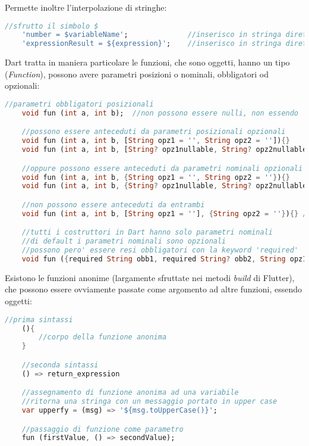 Permette inoltre l'interpolazione di stringhe:
\begin{lstlisting}[language=dart, firstnumber=1,caption={Dart \textit{null safety}}]
    //sfrutto il simbolo $
    'number = $variableName';              //inserisco in stringa direttamente una variabile
    'expressionResult = ${expression}';    //inserisco in stringa direttamente un'espressione
\end{lstlisting}

Dart tratta in maniera particolare le funzioni, che sono oggetti, hanno un tipo (\textit{Function}), possono avere parametri posizioni o nominali, obbligatori od opzionali: 
\begin{lstlisting}[language=dart, firstnumber=1,caption={Dart \textit{null safety}}]
    //parametri obbligatori posizionali
    void fun (int a, int b);  //non possono essere nulli, non essendo 'int? a'

    //possono essere anteceduti da parametri posizionali opzionali
    void fun (int a, int b, [String opz1 = '', String opz2 = '']){}
    void fun (int a, int b, [String? opz1nullable, String? opz2nullable]){}

    //oppure possono essere anteceduti da parametri nominali opzionali
    void fun (int a, int b, {String opz1 = '', String opz2 = ''}){}
    void fun (int a, int b, {String? opz1nullable, String? opz2nullable}){}

    //non possono essere anteceduti da entrambi
    void fun (int a, int b, [String opz1 = ''], {String opz2 = ''}){} //compile error

    //tutti i costruttori in Dart hanno solo parametri nominali
    //di default i parametri nominali sono opzionali
    //possono pero' essere resi obbligatori con la keyword 'required'
    void fun ({required String obb1, required String? obb2, String opz1 = ''}){}
\end{lstlisting}

Esistono le funzioni anonime (largamente sfruttate nei metodi \textit{build} di Flutter), che possono essere ovviamente passate come argomento ad altre funzioni, essendo oggetti:
\begin{lstlisting}[language=dart, firstnumber=1,caption={Dart \textit{null safety}}]
    //prima sintassi
    (){
        //corpo della funzione anonima
    } 

    //seconda sintassi
    () => return_expression

    //assegnamento di funzione anonima ad una variabile
    //ritorna una stringa con un messaggio portato in upper case
    var upperfy = (msg) => '${msg.toUpperCase()}';

    //passaggio di funzione come parametro
    fun (firstValue, () => secondValue);
\end{lstlisting}

